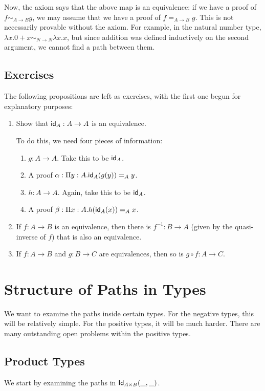 \documentclass[12pt]{article}
\newcommand*{\comp}{\mathbin{\circ}}
\begin{document}
Now, the axiom says that the above map is an equivalence: if we have a proof of
$f \sim_{A\to B} g$, we may assume that we have a proof of $f =_{A\to B} g$.
This is not necessarily provable without the axiom. For example, in the natural
number type, $\lambda x.0+x \sim_{N\to N} \lambda x.x$, but since addition was
defined inductively on the second argument, we cannot find a path between them.

\subsection{Exercises}
The following propositions are left as exercises, with the first one begun for explanatory
purposes:

\begin{enumerate}
 \item Show that $\textsf{id}_A: A\to A$ is an equivalence.
 
 To do this, we need four pieces of information:
 \begin{enumerate}
  \item $g: A\to A$. Take this to be $\textsf{id}_A$.
  \item A proof $\alpha: \Pi y:A. \textsf{id}_A(g (y)) =_A y$.
  \item $h: A\to A$. Again, take this to be $\textsf{id}_A$.
  \item A proof $\beta: \Pi x:A. h(\textsf{id}_A(x)) =_A x$.
 \end{enumerate}

 \item If $f: A\to B$ is an equivalence, then there is $f^{-1}: B\to A$ (given by 
 the quasi-inverse of $f$) that is also an equivalence.
 
 \item If $f: A\to B$ and $g: B\to C$ are equivalences, then so is $g\comp f: A\to C$.
\end{enumerate}



\section{Structure of Paths in Types}

We want to examine the paths inside certain types. For the negative types, this will be
relatively simple. For the positive types, it will be much harder. There are many outstanding
open problems within the positive types.

\subsection{Product Types}
We start by examining the paths in $\mathsf{Id}_{A\times B}(\_,\_)$. 
\end{document}
